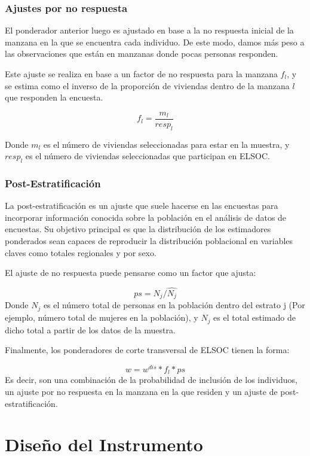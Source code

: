 \documentclass[
  12pt,
]{article}
\begin{document}
\hypertarget{ajustes-por-no-respuesta}{%
\subsubsection{Ajustes por no respuesta}\label{ajustes-por-no-respuesta}}

El ponderador anterior luego es ajustado en base a la no respuesta inicial de la manzana en la que se encuentra cada individuo. De este modo, damos más peso a las observaciones que están en manzanas donde pocas personas responden.

Este ajuste se realiza en base a un factor de no respuesta para la manzana \(f_l\), y se estima como el inverso de la proporción de viviendas dentro de la manzana \(l\) que responden la encuesta.

\[f_l=\frac{m_l}{resp_l}\]

Donde \(m_l\) es el número de viviendas seleccionadas para estar en la muestra, y \(resp_l\) es el número de viviendas seleccionadas que participan en ELSOC.

\hypertarget{post-estratificaciuxf3n}{%
\subsubsection{Post-Estratificación}\label{post-estratificaciuxf3n}}

La post-estratificación es un ajuste que suele hacerse en las encuestas para incorporar información conocida sobre la población en el análisis de datos de encuestas. Su objetivo principal es que la distribución de los estimadores ponderados sean capaces de reproducir la distribución poblacional en variables claves como totales regionales y por sexo.

El ajuste de no respuesta puede pensarse como un factor que ajusta:

\[ps=N_j/\hat{N_j}\]
Donde \(N_j\) es el número total de personas en la población dentro del estrato j (Por ejemplo, número total de mujeres en la población), y \(\hat N_j\) es el total estimado de dicho total a partir de los datos de la muestra.

Finalmente, los ponderadores de corte transversal de ELSOC tienen la forma:

\[w=w^{dis}*f_l*ps\]
Es decir, son una combinación de la probabilidad de inclusión de los individuos, un ajuste por no respuesta en la manzana en la que residen y un ajuste de post-estratificación.

\newpage

\hypertarget{dis_ins}{%
\section{Diseño del Instrumento}\label{dis_ins}}
\end{document}
